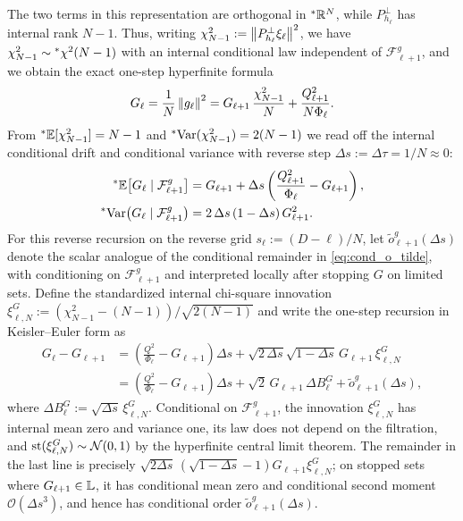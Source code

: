 The two terms in this representation are orthogonal in ${}^*\mathbb{R}^N$, while $P_{h_\ell}^\perp$ has internal rank $N - 1$. Thus, writing $\chi_{N-1}^2 := \left\lVert P_{h_\ell}^\perp \xi_\ell \right\rVert^2$, we have $\chi_{N-1}^2 \sim {}^*\chi^2(N - 1)$ with an internal conditional law independent of $\mathcal{F}_{\ell+1}^g$, and we obtain the exact one-step hyperfinite formula
\begin{equation}
\label{eq:ch6-G-exact-step}
G_\ell = \frac{1}{N}\left\lVert g_\ell \right\rVert^2 = G_{\ell+1}\,\frac{\chi_{N-1}^2}{N} + \frac{Q_{\ell+1}^2}{N \Phi_\ell}.
\end{equation}
From ${}^*\mathbb{E}[\chi_{N-1}^2] = N - 1$ and ${}^*\!\operatorname{Var}(\chi_{N-1}^2) = 2(N - 1)$ we read off the internal conditional drift and conditional variance with reverse step $\Delta s := \Delta\tau = 1/N \approx 0$:
\begin{align}
{}^*\mathbb{E}\bigl[G_\ell \mid \mathcal{F}_{\ell+1}^g\bigr] &= G_{\ell+1} + \Delta s\left(\frac{Q_{\ell+1}^2}{\Phi_\ell} - G_{\ell+1}\right), \label{eq:ch6-G-cond-mean} \\
{}^*\!\operatorname{Var}\bigl(G_\ell \mid \mathcal{F}_{\ell+1}^g\bigr) &= 2\,\Delta s\,(1 - \Delta s)\,G_{\ell+1}^2. \label{eq:ch6-G-cond-var}
\end{align}
For this reverse recursion on the reverse grid $s_\ell := (D - \ell)/N$, let $\tilde{o}_{\ell+1}^g(\Delta s)$ denote the scalar analogue of the conditional remainder in \eqref{eq:cond_o_tilde},
with conditioning on $\mathcal{F}_{\ell+1}^g$ and interpreted locally after stopping $G$ on limited sets. Define the standardized internal chi-square innovation $\xi_{\ell,N}^G := (\chi_{N-1}^2 - (N - 1))/\sqrt{2(N - 1)}$ and write the one-step recursion in Keisler--Euler form as
\begin{equation}
\label{eq:ch6-G-euler}
\begin{aligned}
G_\ell - G_{\ell+1}
&= \left(\frac{Q^2}{\Phi_\ell} - G_{\ell+1}\right)\Delta s + \sqrt{2\,\Delta s}\sqrt{1 - \Delta s}\,G_{\ell+1}\,\xi_{\ell,N}^G \\
&= \left(\frac{Q^2}{\Phi_\ell} - G_{\ell+1}\right)\Delta s + \sqrt{2}\,G_{\ell+1}\,\Delta B_\ell^G + \tilde{o}_{\ell+1}^g(\Delta s),
\end{aligned}
\end{equation}
where $\Delta B_\ell^G := \sqrt{\Delta s}\,\xi_{\ell,N}^G$. Conditional on $\mathcal{F}_{\ell+1}^g$, the innovation $\xi_{\ell,N}^G$ has internal mean zero and variance one, its law does not depend on the filtration, and $\operatorname{st}(\xi_{\ell,N}^G) \sim \mathcal{N}(0, 1)$ by the hyperfinite central limit theorem. The remainder in the last line is precisely $\sqrt{2\Delta s}\,(\sqrt{1 - \Delta s} - 1) G_{\ell+1} \xi_{\ell,N}^G$; on stopped sets where $G_{\ell+1} \in \mathbb{L}$, it has conditional mean zero and conditional second moment $\mathcal{O}(\Delta s^3)$, and hence has conditional order $\tilde{o}_{\ell+1}^g(\Delta s)$.

